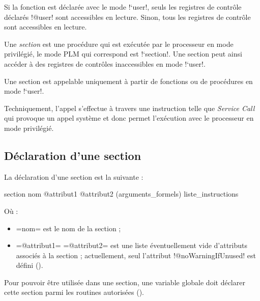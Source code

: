 Si la fonction est déclarée avec le mode \plm!`user!, seuls les registres de contrôle déclarés \plm!@user! sont accessibles en lecture. Sinon, tous les registres de contrôle sont accessibles en lecture.



Une \emph{section} est une procédure qui est exécutée par le processeur en mode privilégié, le mode PLM qui correspond est \plm!`section!. Une section peut ainsi accéder à des registres de contrôles inaccessibles en mode \plm!`user!.

Une section est appelable uniquement à partir de fonctions ou de procédures en mode \plm!`user!.

Techniquement, l'appel s'effectue à travers une instruction telle que \emph{Service Call} qui provoque un appel système et donc permet l'exécution avec le processeur en mode privilégié.




















\subsection{Déclaration d'une section}


La déclaration d'une section est la suivante :
\begin{PLM}
section nom @attribut1 @attribut2 (arguments_formels) {
  liste_instructions
}
\end{PLM}
Où :
\begin{itemize}
  \item \plm=nom= est le nom de la section ;
  \item \plm=@attribut1= \plm=@attribut2= est une liste éventuellement vide d'attributs associés à la section ; actuellement, seul l'attribut \plm!@noWarningIfUnused! est défini ().
\end{itemize}




Pour pouvoir être utilisée dans une section, une variable globale doit déclarer cette section parmi les routines autorisées ().



